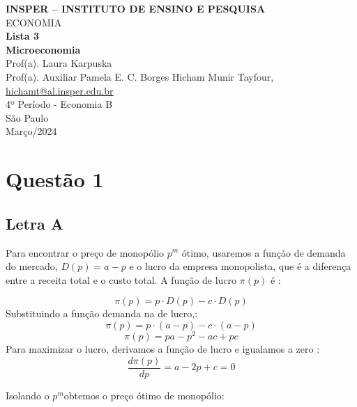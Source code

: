 \documentclass[12pt]{article}
\begin{document}
\begin{titlepage}
    \centering
    \vspace*{1cm}
    \Large\textbf{INSPER – INSTITUTO DE ENSINO E PESQUISA}\\
    \Large ECONOMIA\\
    \vspace{1.5cm}
    \Large\textbf{Lista 3}\\
    \textbf{Microeconomia}\\
    \vspace{1.5cm}
    Prof(a). Laura Karpuska \\
    Prof(a). Auxiliar  Pamela E. C. Borges
    \vfill
    \normalsize
    Hicham Munir Tayfour, \href{mailto:hichamt@al.insper.edu.br}{hichamt@al.insper.edu.br}\\
    4º Período - Economia B\\
    \vfill
    São Paulo\\
    Março/2024
\end{titlepage}

\newpage

\newpage
\tableofcontents
\thispagestyle{empty} %
\newpage
\setcounter{page}{1} %
\justify
\onehalfspacing

\pagestyle{fancy}
\fancyhf{}
\rhead{\thepage}



\section{\textbf{Questão 1}}

\subsection{\textbf{Letra A}}
Para encontrar o preço de monopólio \( p^m \) ótimo, usaremos a função de demanda do mercado,  \( D(p) = a - p \) e o lucro da empresa monopolista, que é a diferença entre a receita total e o custo total.
A função de lucro \(\pi(p)\) é :

\[
\pi(p) = p \cdot D(p) - c \cdot D(p)
\]
Substituindo a função  demanda na de lucro,:
\[
\pi(p) = p \cdot (a - p) - c \cdot (a - p)
\]
\[
\pi(p) = pa - p^2 - ac + pc
\]
Para maximizar o lucro, derivamos a função de lucro e igualamos a zero :
\[
\frac{d\pi(p)}{dp} = a - 2p + c = 0
\]

Isolando o  \( p^m \)obtemos o preço ótimo de monopólio:
\end{document}
